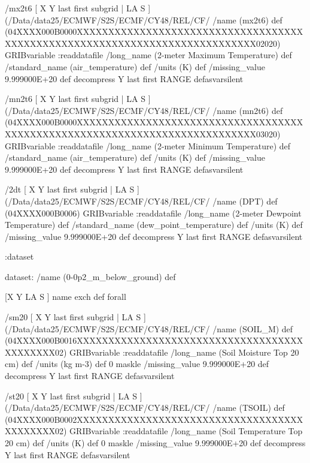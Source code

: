 \begin{ingrid}
/mx2t6 { [ X Y last first subgrid | LA S ] (/Data/data25/ECMWF/S2S/ECMF/CY48/REL/CF/%
/name (mx2t6) def
(04XXXX000B0000XXXXXXXXXXXXXXXXXXXXXXXXXXXXXXXXXXXXXXXXXXXXXXXXXXXXXXXXXXXXXXXXXXXXXXXXXXXX02020) GRIBvariable
:readdatafile
/long_name (2-meter Maximum Temperature) def
/standard_name (air_temperature) def
/units (K) def
/missing_value 9.999000E+20 def
decompress
Y last first RANGE
} defasvarsilent

/mn2t6 { [ X Y last first subgrid | LA S ] (/Data/data25/ECMWF/S2S/ECMF/CY48/REL/CF/%
/name (mn2t6) def
(04XXXX000B0000XXXXXXXXXXXXXXXXXXXXXXXXXXXXXXXXXXXXXXXXXXXXXXXXXXXXXXXXXXXXXXXXXXXXXXXXXXXX03020) GRIBvariable
:readdatafile
/long_name (2-meter Minimum Temperature) def
/standard_name (air_temperature) def
/units (K) def
/missing_value 9.999000E+20 def
decompress
Y last first RANGE
} defasvarsilent

/2dt { [ X Y last first subgrid | LA S ] (/Data/data25/ECMWF/S2S/ECMF/CY48/REL/CF/%
/name (DPT) def
(04XXXX000B0006) GRIBvariable
:readdatafile
/long_name (2-meter Dewpoint Temperature) def
/standard_name (dew_point_temperature) def
/units (K) def
/missing_value 9.999000E+20 def
decompress
Y last first RANGE
} defasvarsilent

:dataset

dataset:
/name (0-0p2_m_below_ground) def

[X Y LA S ] {name exch def } forall

/sm20 { [ X Y last first subgrid | LA S ] (/Data/data25/ECMWF/S2S/ECMF/CY48/REL/CF/%
/name (SOIL_M) def
(04XXXX000B0016XXXXXXXXXXXXXXXXXXXXXXXXXXXXXXXXXXXXXXXXXXXX02) GRIBvariable
:readdatafile
/long_name (Soil Moisture Top 20 cm) def
/units (kg m-3) def
0 maskle
/missing_value 9.999000E+20 def
decompress
Y last first RANGE
} defasvarsilent


/st20 { [ X Y last first subgrid | LA S ] (/Data/data25/ECMWF/S2S/ECMF/CY48/REL/CF/%
/name (TSOIL) def
(04XXXX000B0002XXXXXXXXXXXXXXXXXXXXXXXXXXXXXXXXXXXXXXXXXXXX02) GRIBvariable
:readdatafile
/long_name (Soil Temperature Top 20 cm) def
/units (K) def
0 maskle
/missing_value 9.999000E+20 def
decompress
Y last first RANGE
} defasvarsilent


\end{ingrid}
